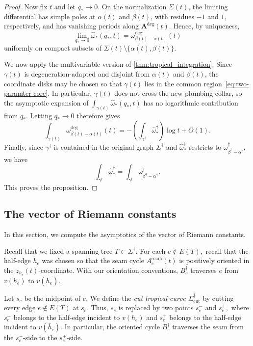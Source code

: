 \documentclass[12pt]{amsart}
\numberwithin{equation}{section}
\theoremstyle{definition}
\def\edges{E}
\def\trop{\dagger}
\def\mcurve{\Sigma}
\def\tropmcurve{\mcurve^\trop}
\begin{document}
\begin{proof}
Now fix $t$ and let $q_*\to0$. On the normalization $\mcurve(t)$, the
limiting differential has simple poles at $\alpha(t)$ and $\beta(t)$,
with residues $-1$ and $1$, respectively, and has vanishing periods
along $\bm A^{\mathrm{deg}}(t)$. Hence, by uniqueness,
\[
\lim_{q_*\to0}
\widehat\omega_*(q_*,t)
=
\omega_{\beta(t)-\alpha(t)}^{\mathrm{deg}}(t)
\]
uniformly on compact subsets of
$
\mcurve(t)\setminus\{\alpha(t),\beta(t)\}.
$

We now apply the multivariable version of
\cref{thm:tropical_integration}. Since $\gamma(t)$ is
degeneration-adapted and disjoint from $\alpha(t)$ and $\beta(t)$, the
coordinate disks may be chosen so that $\gamma(t)$ lies in the common
region~\eqref{eq:two-paramter-core}. In particular, $\gamma(t)$ does
not cross the new plumbing collar, so the asymptotic expansion
of
$
\int_{\gamma(t)}\widehat\omega_*(q_*,t)
$
has no logarithmic contribution from $q_*$. Letting $q_* \to 0$ therefore
gives
\[
\int_{\gamma(t)}
\omega_{\beta(t)-\alpha(t)}^{\mathrm{deg}}(t)
=
-
\left(
\int_{\gamma^\trop}
\widehat\omega_*^\trop
\right)
\log t
+
O(1).
\]
Finally, since $\gamma^\trop$ is contained in the original graph
$\tropmcurve$ and
$
\widehat\omega_*^\trop
$
restricts to
$
\omega_{\beta^\trop-\alpha^\trop}^\trop,
$
we have
\[
\int_{\gamma^\trop}
\widehat\omega_*^\trop
=
\int_{\gamma^\trop}
\omega_{\beta^\trop-\alpha^\trop}^\trop.
\]
This proves the proposition.
\end{proof}



\subsection{The vector of Riemann constants}
\label{sec:trop_riemann_constants}

In this section, we compute the asymptotics of the vector of Riemann
constants.

Recall that we fixed a spanning tree
$
T\subset\tropmcurve.
$
For each
$
e\notin\edges(T),
$
recall that the half-edge $h_e$ was chosen so that the seam cycle
$A_e^{\mathrm{seam}}(t)$ is positively oriented in the
$z_{h_e}(t)$-coordinate. With our orientation conventions,
$B_e^\trop$ traverses $e$ from $v(h_e)$ to $v(\bar h_e)$.

Let $s_e$ be the midpoint of $e$. We define the \emph{cut tropical curve}
$\tropmcurve_{\mathrm{cut}}$ by cutting every edge
$
e\notin\edges(T)
$
at $s_e$. Thus, $s_e$ is replaced by two points
$
s_e^-
$
and
$
s_e^+,
$
where $s_e^-$ belongs to the half-edge incident to $v(h_e)$ and
$s_e^+$ belongs to the half-edge incident to $v(\bar h_e)$. In
particular, the oriented cycle $B_e^\trop$ traverses the seam from the
$s_e^-$-side to the $s_e^+$-side. 
\end{document}
